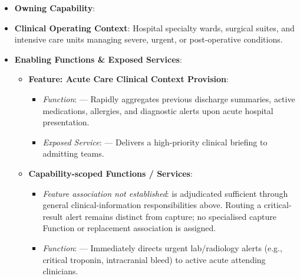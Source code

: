 \begin{itemize}

\item
\textbf{Owning Capability}: \texttt{}



\item
\textbf{Clinical Operating Context}: Hospital specialty wards, surgical suites, and intensive care units managing severe, urgent, or post-operative conditions.



\item
\textbf{Enabling Functions \& Exposed Services}:


\begin{itemize}

\item
\textbf{Feature: Acute Care Clinical Context Provision}:


\begin{itemize}

\item
\emph{Function}: \texttt{} — Rapidly aggregates previous discharge summaries, active medications, allergies, and diagnostic alerts upon acute hospital presentation.



\item
\emph{Exposed Service}: \texttt{} — Delivers a high-priority clinical briefing to admitting teams.



\end{itemize}


\item
\textbf{Capability-scoped Functions /\allowbreak{} Services}:


\begin{itemize}

\item
\emph{Feature association not established}: \texttt{} is adjudicated sufficient through general clinical-information responsibilities above. Routing a critical-result alert remains distinct from capture; no specialised capture Function or replacement association is assigned.



\item
\emph{Function}: \texttt{} — Immediately directs urgent lab/\allowbreak{}radiology alerts (e.g., critical troponin, intracranial bleed) to active acute attending clinicians.




\end{itemize}
\end{itemize}
\end{itemize}
